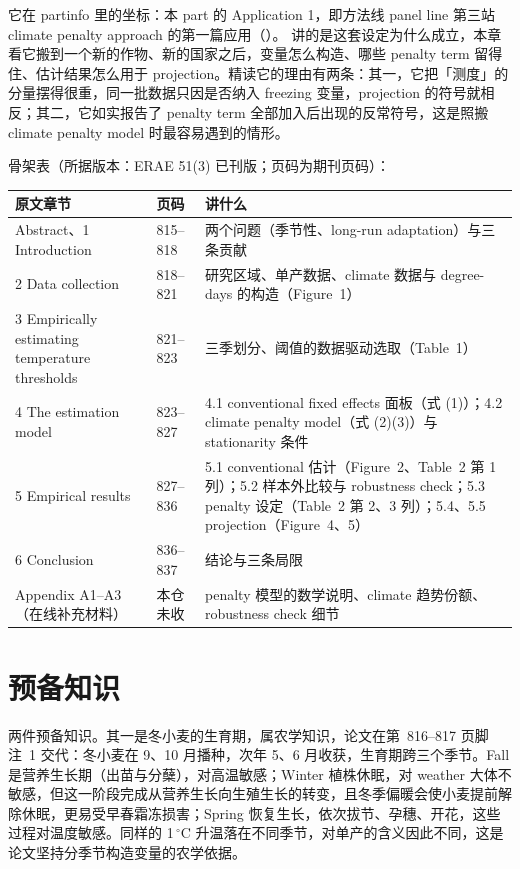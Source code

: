 它在 partinfo 里的坐标：本 part 的 Application 1，即方法线 panel line 第三站 climate penalty approach 的第一篇应用（）。 讲的是这套设定为什么成立，本章看它搬到一个新的作物、新的国家之后，变量怎么构造、哪些 penalty term 留得住、估计结果怎么用于 projection。精读它的理由有两条：其一，它把「测度」的分量摆得很重，同一批数据只因是否纳入 freezing 变量，projection 的符号就相反；其二，它如实报告了 penalty term 全部加入后出现的反常符号，这是照搬 climate penalty model 时最容易遇到的情形。

骨架表（所据版本：ERAE 51(3) 已刊版；页码为期刊页码）：

\begin{table}[htbp]
\centering\small
\begin{tabular}{@{}p{5.6cm}p{1.6cm}p{5.8cm}@{}}
\toprule
原文章节 & 页码 & 讲什么 \\
\midrule
Abstract、1 Introduction & 815--818 & 两个问题（季节性、long-run adaptation）与三条贡献 \\
2 Data collection & 818--821 & 研究区域、单产数据、climate 数据与 degree-days 的构造（Figure~1） \\
3 Empirically estimating temperature thresholds & 821--823 & 三季划分、阈值的数据驱动选取（Table~1） \\
4 The estimation model & 823--827 & 4.1 conventional fixed effects 面板（式 (1)）；4.2 climate penalty model（式 (2)(3)）与 stationarity 条件 \\
5 Empirical results & 827--836 & 5.1 conventional 估计（Figure~2、Table~2 第 1 列）；5.2 样本外比较与 robustness check；5.3 penalty 设定（Table~2 第 2、3 列）；5.4、5.5 projection（Figure~4、5） \\
6 Conclusion & 836--837 & 结论与三条局限 \\
Appendix A1--A3（在线补充材料） & 本仓未收 & penalty 模型的数学说明、climate 趋势份额、robustness check 细节 \\
\bottomrule
\end{tabular}
\end{table}

\section{预备知识}

两件预备知识。其一是冬小麦的生育期，属农学知识，论文在第~816--817 页脚注~1 交代：冬小麦在 9、10 月播种，次年 5、6 月收获，生育期跨三个季节。Fall 是营养生长期（出苗与分蘖），对高温敏感；Winter 植株休眠，对 weather 大体不敏感，但这一阶段完成从营养生长向生殖生长的转变，且冬季偏暖会使小麦提前解除休眠，更易受早春霜冻损害；Spring 恢复生长，依次拔节、孕穗、开花，这些过程对温度敏感。同样的 1\,$^\circ$C 升温落在不同季节，对单产的含义因此不同，这是论文坚持分季节构造变量的农学依据。

